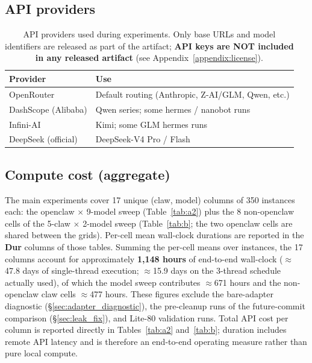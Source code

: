 \subsection{API providers}

\begin{table}[h]
\centering
\small
\begin{tabular}{ll}
\toprule
\textbf{Provider} & \textbf{Use} \\
\midrule
OpenRouter           & Default routing (Anthropic, Z-AI/GLM, Qwen, etc.) \\
DashScope (Alibaba)  & Qwen series; some hermes / nanobot runs \\
Infini-AI            & Kimi; some GLM hermes runs \\
DeepSeek (official)  & DeepSeek-V4 Pro / Flash \\
\bottomrule
\end{tabular}
\caption{API providers used during experiments. Only base URLs and model
identifiers are released as part of the artifact; \textbf{API keys are NOT
included in any released artifact} (see Appendix~\ref{appendix:license}).}
\label{tab:appx-d-providers}
\end{table}

\subsection{ Compute cost (aggregate)}

The main experiments cover 17 unique (claw, model) columns of 350 instances
each: the openclaw $\times$ 9-model sweep (Table~\ref{tab:a2}) plus the 8
non-openclaw cells of the 5-claw $\times$ 2-model sweep
(Table~\ref{tab:b}; the two openclaw cells are shared between the grids).
Per-cell mean wall-clock durations are reported in the \textbf{Dur} columns of
those tables. Summing the per-cell means over instances, the 17 columns
account for approximately \textbf{1{,}148 hours} of end-to-end wall-clock
($\approx$47.8 days of single-thread execution; $\approx$15.9 days on the
3-thread schedule actually used), of which the model sweep contributes
$\approx$671 hours and the non-openclaw claw cells $\approx$477 hours. These
figures exclude the bare-adapter diagnostic (\S\ref{sec:adapter_diagnostic}),
the pre-cleanup runs of the future-commit comparison (\S\ref{sec:leak_fix}),
and Lite-80 validation runs. Total API cost per column is reported directly in
Tables~\ref{tab:a2} and~\ref{tab:b}; duration includes remote API latency and
is therefore an end-to-end operating measure rather than pure local compute.


